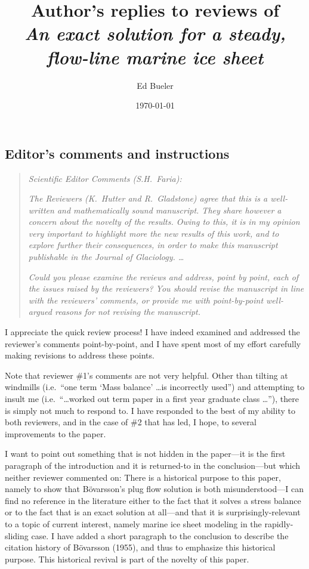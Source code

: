 \documentclass[11pt,reqno]{amsart}
\title[Author's replies to reviews of \emph{An exact solution \dots}]{Author's replies to reviews of \\ \emph{An exact solution for a steady, flow-line marine ice sheet}}
\author{Ed Bueler}
\date{\today}
\renewcommand{\dh}{\fontencoding{T1}\selectfont{\symbol{240}}}
\newcommand{\bod}{B\"o\dh varsson\xspace}
\newcommand{\citebod}{B\"o\dh varsson (1955)\nocite{Bodvardsson}\xspace}
\begin{document}
\maketitle

\thispagestyle{empty}



\subsection*{Editor's comments and instructions}  \begin{quote}
\emph{Scientific Editor Comments (S.H.~Faria):}

\emph{The Reviewers (K.~Hutter and R.~Gladstone) agree that this is a well-written and mathematically sound manuscript. They share however a concern about the novelty of the results. Owing to this, it is in my opinion very important to highlight more the new results of this work, and to explore further their consequences, in order to make this manuscript publishable in the Journal of Glaciology.  \dots}

\emph{Could you please examine the reviews and address, point by point, each of the issues raised by the reviewers? You should revise the manuscript in line with the reviewers' comments, or provide me with point-by-point well-argued reasons for not revising the manuscript.}
\end{quote}

\medskip
\noindent I appreciate the quick review process!  I have indeed examined and addressed the reviewer's comments point-by-point, and I have spent most of my effort carefully making revisions to address these points.

\medskip
\noindent Note that reviewer \#1's comments are not very helpful.  Other than tilting at windmills (i.e.~``one term `Mass balance' \dots is incorrectly used'') and attempting to insult me (i.e.~``\dots worked out term paper in a first year graduate class \dots''), there is simply not much to respond to.  I have responded to the best of my ability to both reviewers, and in the case of \#2 that has led, I hope, to several improvements to the paper.

\medskip
\noindent I want to point out something that is not hidden in the paper---it is the first paragraph of the introduction and it is returned-to in the conclusion---but which neither reviewer commented on:  There is a historical purpose to this paper, namely to show that \bod's plug flow solution is both misunderstood---I can find no reference in the literature either to the fact that it solves a stress balance or to the fact that is an exact solution at all---and that it is surprisingly-relevant to a topic of current interest, namely marine ice sheet modeling in the rapidly-sliding case.  I have added a short paragraph to the conclusion to describe the citation history of \citebod, and thus to emphasize this historical purpose.  This historical revival is part of the novelty of this paper.
\end{document}
